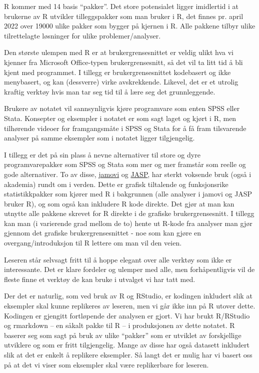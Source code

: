 \documentclass[
]{article}
\begin{document}
R kommer med 14 basis ``pakker''. Det store potensialet ligger imidlertid i at brukerne av R utvikler tilleggspakker som man bruker i R, det finnes pr. april 2022 over 19000 ulike pakker som bygger på kjernen i R. Alle pakkene tilbyr ulike tilrettelagte løsninger for ulike problemer/analyser.

Den største ulempen med R er at brukergrensesnittet er veldig ulikt hva vi kjenner fra Microsoft Office-typen brukergrensesnitt, så det vil ta litt tid å bli kjent med programmet. I tillegg er brukergrensesnittet kodebasert og ikke menybasert, og kan (dessverre) virke avskrekkende. Likevel, det er et utrolig kraftig verktøy hvis man tar seg tid til å lære seg det grunnleggende.

Brukere av notatet vil sannsynligvis kjøre programvare som enten SPSS eller Stata. Konsepter og eksempler i notatet er som sagt laget og kjørt i R, men tilhørende videoer for framgangsmåte i SPSS og Stata for å få fram tilsvarende analyser på samme eksempler som i notatet ligger tilgjengelig.

I tillegg er det på sin plass å nevne alternativer til store og dyre programvarepakker som SPSS og Stata som mer og mer framstår som reelle og gode alternativer. To av disse, \href{https://www.jamovi.org/}{jamovi} og \href{https://jasp-stats.org/}{JASP}, har sterkt voksende bruk (også i akademia) rundt om i verden. Dette er grafisk tiltalende og funksjonsrike statistikkpakker som kjører med R i bakgrunnen (alle analyser i jamovi og JASP bruker R), og som også kan inkludere R kode direkte. Det gjør at man kan utnytte alle pakkene skrevet for R direkte i de grafiske brukergrensesnitt. I tillegg kan man (i varierende grad mellom de to) hente ut R-kode fra analyser man gjør gjennom det grafiske brukergrensesnittet - noe som kan gjøre en overgang/introduksjon til R lettere om man vil den veien.

Leseren står selvsagt fritt til å hoppe elegant over alle verktøy som ikke er interessante. Det er klare fordeler og ulemper med alle, men forhåpentligvis vil de fleste finne et verktøy de kan bruke i utvalget vi har tatt med.

Der det er naturlig, som ved bruk av R og RStudio, er kodingen inkludert slik at eksempler skal kunne replikeres av leseren, men vi går ikke inn på R utover dette. Kodingen er gjengitt fortløpende der analysen er gjort. Vi har brukt R/RStudio og rmarkdown \citep{allaireRmarkdownDynamicDocuments2022} -- en såkalt pakke til R -- i produksjonen av dette notatet. R baserer seg som sagt på bruk av ulike ``pakker'' som er utviklet av forskjellige utviklere og som er fritt tilgjengelig. Mange av disse har også datasett inkludert slik at det er enkelt å replikere eksempler. Så langt det er mulig har vi basert oss på at det vi viser som eksempler skal være replikerbare for leseren.
\end{document}
